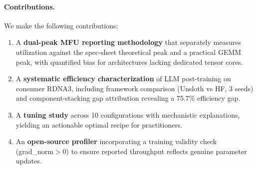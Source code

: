 \paragraph{Contributions.} We make the following contributions:
\begin{enumerate}
    \item A \textbf{dual-peak MFU reporting methodology} that separately measures utilization against the spec-sheet theoretical peak and a practical GEMM peak, with quantified bias for architectures lacking dedicated tensor cores.
    \item A \textbf{systematic efficiency characterization} of LLM post-training on consumer RDNA3, including framework comparison (Unsloth vs HF, 3 seeds) and component-stacking gap attribution revealing a 75.7\% efficiency gap.
    \item A \textbf{tuning study} across 10 configurations with mechanistic explanations, yielding an actionable optimal recipe for practitioners.
    \item An \textbf{open-source profiler} incorporating a training validity check (grad\_norm$>$0) to ensure reported throughput reflects genuine parameter updates.
\end{enumerate}
